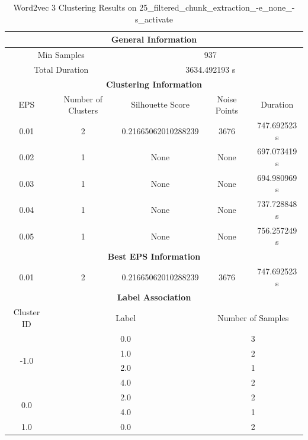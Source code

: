 \begin{longtable}{|c|c|c|c|c|}
\caption{Word2vec 3 Clustering Results on 25\_filtered\_chunk\_extraction\_-e\_none\_-s\_activate} \label{tab:25_filtered_chunk_extraction_-e_none_-s_activate_word2vec_3_clustering_results}\\
\hline
\multicolumn{5}{|c|}{\textbf{General Information}} \\
\hline
\multicolumn{2}{|c|}{Min Samples} & \multicolumn{3}{c|}{937} \\
\multicolumn{2}{|c|}{Total Duration} & \multicolumn{3}{c|}{3634.492193 s} \\
\hline
\multicolumn{5}{|c|}{\textbf{Clustering Information}} \\
\hline
EPS & Number of Clusters & Silhouette Score & Noise Points & Duration \\
0.01 & 2 & 0.21665062010288239 & 3676 & 747.692523 s\\
0.02 & 1 & None & None & 697.073419 s\\
0.03 & 1 & None & None & 694.980969 s\\
0.04 & 1 & None & None & 737.728848 s\\
0.05 & 1 & None & None & 756.257249 s\\
\hline
\multicolumn{5}{|c|}{\textbf{Best EPS Information}} \\
\hline
0.01 & 2 & 0.21665062010288239 & 3676 & 747.692523 s\\
\hline
\multicolumn{5}{|c|}{\textbf{Label Association}} \\
\hline
Cluster ID & \multicolumn{2}{c|}{Label} & \multicolumn{2}{c|}{Number of Samples} \\
\hline
\multirow{4}{*}{-1.0} & \multicolumn{2}{c|}{0.0} & \multicolumn{2}{c|}{3} \\
& \multicolumn{2}{c|}{1.0} & \multicolumn{2}{c|}{2} \\
& \multicolumn{2}{c|}{2.0} & \multicolumn{2}{c|}{1} \\
& \multicolumn{2}{c|}{4.0} & \multicolumn{2}{c|}{2} \\
\hline
\multirow{2}{*}{0.0} & \multicolumn{2}{c|}{2.0} & \multicolumn{2}{c|}{2} \\
& \multicolumn{2}{c|}{4.0} & \multicolumn{2}{c|}{1} \\
\hline
\multirow{1}{*}{1.0} & \multicolumn{2}{c|}{0.0} & \multicolumn{2}{c|}{2} \\
\hline
\end{longtable}



